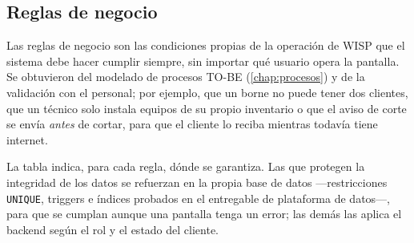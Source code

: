 \subsection{Reglas de negocio}
\label{sec:ce02-rn}

Las reglas de negocio son las condiciones propias de la operación de WISP que el sistema
debe hacer cumplir siempre, sin importar qué usuario opera la pantalla. Se obtuvieron del
modelado de procesos TO-BE (\cref{chap:procesos}) y de la validación con el personal; por
ejemplo, que un borne no puede tener dos clientes, que un técnico solo instala equipos de
su propio inventario o que el aviso de corte se envía \emph{antes} de cortar, para que el
cliente lo reciba mientras todavía tiene internet.

La tabla indica, para cada regla, dónde se garantiza. Las que protegen la integridad de los
datos se refuerzan en la propia base de datos ---restricciones \texttt{UNIQUE}, triggers e
índices probados en el entregable de plataforma de datos---, para que se cumplan aunque una
pantalla tenga un error; las demás las aplica el backend según el rol y el estado del
cliente.

